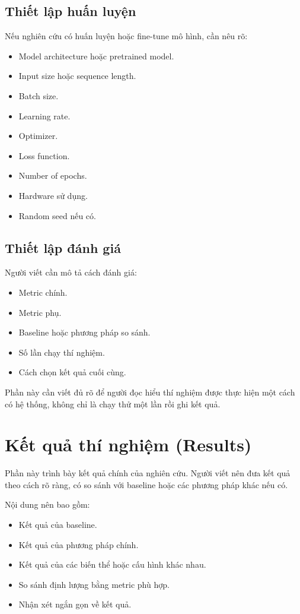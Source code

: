 \documentclass[12pt]{ai_conquer2026}
\begin{document}
\subsection{Thiết lập huấn luyện}

Nếu nghiên cứu có huấn luyện hoặc fine-tune mô hình, cần nêu rõ:

\begin{itemize}
\item Model architecture hoặc pretrained model.
\item Input size hoặc sequence length.
\item Batch size.
\item Learning rate.
\item Optimizer.
\item Loss function.
\item Number of epochs.
\item Hardware sử dụng.
\item Random seed nếu có.
\end{itemize}

\subsection{Thiết lập đánh giá}

Người viết cần mô tả cách đánh giá:

\begin{itemize}
\item Metric chính.
\item Metric phụ.
\item Baseline hoặc phương pháp so sánh.
\item Số lần chạy thí nghiệm.
\item Cách chọn kết quả cuối cùng.
\end{itemize}

Phần này cần viết đủ rõ để người đọc hiểu thí nghiệm được thực hiện một cách có hệ thống, không chỉ là chạy thử một lần rồi ghi kết quả.

\section{Kết quả thí nghiệm (Results)}

Phần này trình bày kết quả chính của nghiên cứu. Người viết nên đưa kết quả theo cách rõ ràng, có so sánh với baseline hoặc các phương pháp khác nếu có.

Nội dung nên bao gồm:

\begin{itemize}
\item Kết quả của baseline.
\item Kết quả của phương pháp chính.
\item Kết quả của các biến thể hoặc cấu hình khác nhau.
\item So sánh định lượng bằng metric phù hợp.
\item Nhận xét ngắn gọn về kết quả.
\end{itemize}
\end{document}
